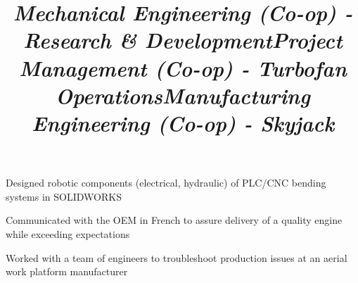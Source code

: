 \documentclass[mm]{res}
\begin{document}
\begin{resume}
\title{\textsl{Mechanical Engineering (Co-op) - Research \& Development}}
\begin{position}
\tb Designed robotic components (electrical, hydraulic) of PLC/CNC bending systems in SOLIDWORKS
\end{position}

\title{\textsl{Project Management (Co-op) - Turbofan Operations}}
\begin{position}
\tb Communicated with the OEM in French to assure delivery of a quality engine while exceeding expectations
\end{position}

\title{\textsl{Manufacturing Engineering (Co-op) - Skyjack}}
\begin{position}
\tb Worked with a team of engineers to troubleshoot production issues at an aerial work platform manufacturer
\end{position}



\end{resume}
\end{document}
